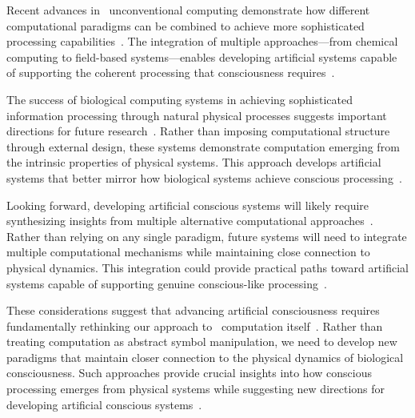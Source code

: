 Recent advances in~ unconventional computing demonstrate how different computational paradigms can be combined to achieve more sophisticated processing capabilities~\cite{Gorecki2020,hunt2024electromagnetic,Michalikova2019}. The integration of multiple approaches—from chemical computing to field-based systems—enables developing artificial systems capable of supporting the coherent processing that consciousness requires~\cite{Jaeger2021,gallagher2020phenomenological}.

The success of biological computing systems in achieving sophisticated information processing through natural physical processes suggests important directions for future research~\cite{Mayne2019,chalmers1997conscious,bosl2025dynamical}. Rather than imposing computational structure through external design, these systems demonstrate computation emerging from the intrinsic properties of physical systems. This approach develops artificial systems that better mirror how biological systems achieve conscious processing~\cite{Nakagaki2020,zheng2025unbearable}.

Looking forward, developing artificial conscious systems will likely require synthesizing insights from multiple alternative computational approaches~\cite{Stepney2018,ruffini2020realistic,Larkum2022b}. Rather than relying on any single paradigm, future systems will need to integrate multiple computational mechanisms while maintaining close connection to physical dynamics. This integration could provide practical paths toward artificial systems capable of supporting genuine conscious-like processing~\cite{Toffoli2019,seth2024conscious}.

These considerations suggest that advancing artificial consciousness requires fundamentally rethinking our approach to~ computation itself~\cite{Zauner2020,damasio2006descartes,varela1996neurophenomenology}. Rather than treating computation as abstract symbol manipulation, we need to develop new paradigms that maintain closer connection to the physical dynamics of biological consciousness. Such approaches provide crucial insights into how conscious processing emerges from physical systems while suggesting new directions for developing artificial conscious systems~\cite{da2024mathematical,haier1988cortical}.

